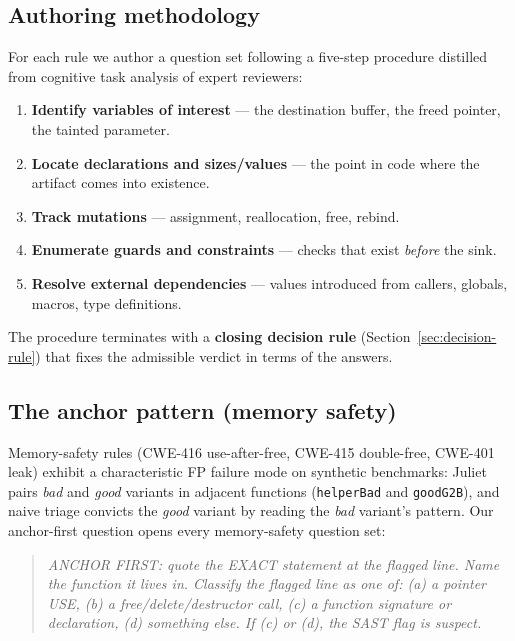 \documentclass[11pt,a4paper]{article}
\begin{document}
\subsection{Authoring methodology}
\label{sec:question-authoring}

For each rule we author a question set following a five-step procedure
distilled from cognitive task analysis of expert reviewers:

\begin{enumerate}[leftmargin=*]
\item \textbf{Identify variables of interest} --- the destination
  buffer, the freed pointer, the tainted parameter.
\item \textbf{Locate declarations and sizes/values} --- the point in
  code where the artifact comes into existence.
\item \textbf{Track mutations} --- assignment, reallocation, free,
  rebind.
\item \textbf{Enumerate guards and constraints} --- checks that exist
  \emph{before} the sink.
\item \textbf{Resolve external dependencies} --- values introduced from
  callers, globals, macros, type definitions.
\end{enumerate}

The procedure terminates with a \textbf{closing decision rule}
(Section~\ref{sec:decision-rule}) that fixes the admissible verdict in
terms of the answers.

\subsection{The anchor pattern (memory safety)}

Memory-safety rules (CWE-416 use-after-free, CWE-415 double-free,
CWE-401 leak) exhibit a characteristic FP failure mode on synthetic
benchmarks: Juliet pairs \emph{bad} and \emph{good} variants in
adjacent functions (\texttt{helperBad} and \texttt{goodG2B}), and naive
triage convicts the \emph{good} variant by reading the \emph{bad}
variant's pattern. Our anchor-first question opens every memory-safety
question set:

\begin{quote}
\emph{ANCHOR FIRST: quote the EXACT statement at the flagged line. Name
the function it lives in. Classify the flagged line as one of: (a) a
pointer USE, (b) a free/delete/destructor call, (c) a function
signature or declaration, (d) something else. If (c) or (d), the SAST
flag is suspect.}
\end{quote}
\end{document}

